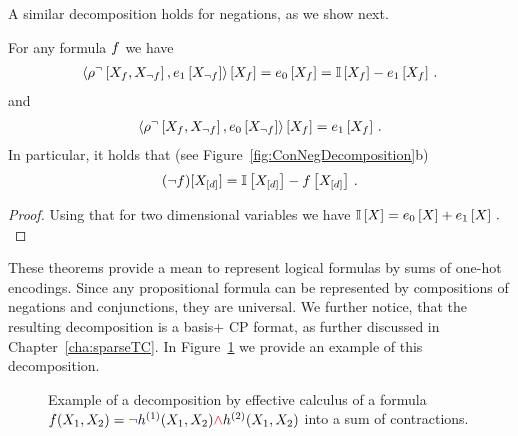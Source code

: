 A similar decomposition holds for negations, as we show next.

\begin{theorem}
	For any formula $f$ we have
	\begin{align*}
		\left\langle 
			\rho^{\lnot}\left[X_{f},X_{\lnot f}\right],e_{1}\left[X_{\lnot f}\right]
		\right\rangle \left[ X_{f} \right]
		= e_{0}\left[X_{f}\right] =  \mathbb{I}\left[X_{f}\right] - e_{1}\left[X_{f}\right] \, . 
	\end{align*}
	and
	\begin{align*}
		\left\langle 
			\rho^{\lnot}\left[X_{f},X_{\lnot f}\right],e_{0}\left[X_{\lnot f}\right]
		\right\rangle \left[ X_{f} \right]
		= e_{1}\left[X_{f}\right] \, . 
	\end{align*}
	In particular, it holds that (see Figure~\ref{fig:ConNegDecomposition}b)
	\begin{align*}
		(\lnot f)[X_{[d]}] = \mathbb{I}\left[X_{[d]}\right] - f\left[X_{[d]}\right]  \, . 
	\end{align*}
\end{theorem}
\begin{proof}
	Using that for two dimensional variables we have $\mathbb{I}\left[X\right]=e_{0}\left[X\right]+e_{1}\left[X\right]\, .$
\end{proof}

These theorems provide a mean to represent logical formulas by sums of one-hot encodings.
Since any propositional formula can be represented by compositions of negations and conjunctions, they are universal.
We further notice, that the resulting decomposition is a basis+ CP format, as further discussed in Chapter~\ref{cha:sparseTC}.
In Figure~\ref{fig:DecompositionExample} we provide an example of this decomposition.


\begin{figure}
\begin{center}
	
\end{center}
\caption{
	Example of a decomposition by effective calculus of a formula $f(X_{1},X_{2}) = \textcolor{blue}{\lnot} h^{(1)}(X_{1},X_{2}) \textcolor{red}{\land}  h^{(2)}(X_{1},X_{2})$ into a sum of contractions.}
	\label{fig:DecompositionExample}
\end{figure}




